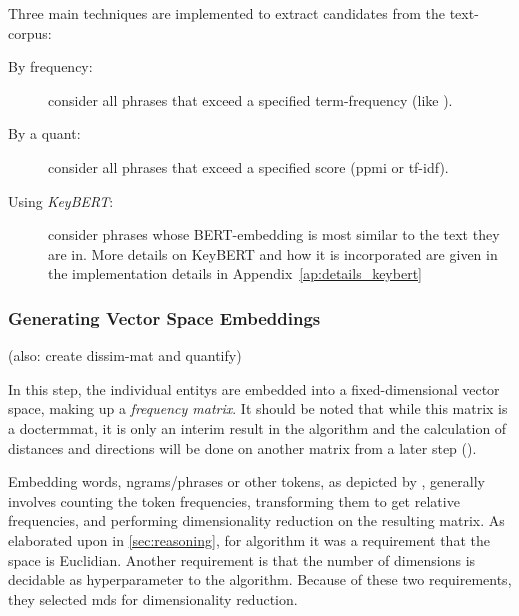 Three main techniques are implemented to extract candidates from the text-corpus: 
\begin{description}
	\item[By frequency:] consider all phrases that exceed a specified term-frequency (like \cite{Derrac2015}).
	\item[By a \gls{quant}:] consider all phrases that exceed a specified score (\gls{ppmi} or \gls{tf-idf}).
	\item[Using \emph{KeyBERT}\cite{grootendorst2020keybert}:] consider phrases whose BERT-embedding \cite{Devlin2019} is most similar to the text they are in. More details on KeyBERT and how it is incorporated are given in the implementation details in Appendix~\ref{ap:details_keybert}
\end{description}



\subsubsection{Generating Vector Space Embeddings}
\label{sec:generate_vectorspaces}

(also: create dissim-mat and quantify)



In this step, the individual \glspl{entity} are embedded into a fixed-dimensional vector space, making up a \emph{frequency matrix}. It should be noted that while this matrix is a \gls{doctermmat}, it is only an interim result in the algorithm and the calculation of distances and directions will be done on another matrix from a later step ().

Embedding words, \glspl{ngram}/phrases or other tokens, as depicted by \cite{Turney2010,Lowe}, generally involves counting the token frequencies, transforming them to get relative frequencies, and performing dimensionality reduction on the resulting matrix. As elaborated upon in \autoref{sec:reasoning}, for  algorithm it was a requirement that the space is Euclidian. Another requirement is that the number of dimensions is decidable as hyperparameter to the algorithm. Because of these two requirements, they selected \gls{mds} for dimensionality reduction.

